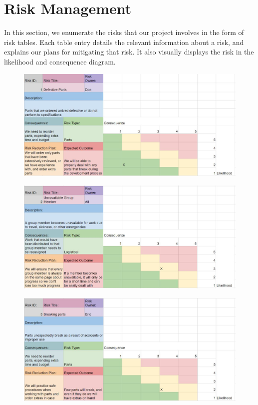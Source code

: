 
\section{Risk Management}
\label{sec:risk_management}

In this section, we enumerate the risks that our project involves in the form of risk tables. Each table entry details the relevant information about a risk, and explains our plans for mitigating that risk. It also visually displays the risk in the likelihood and consequence diagram. 

\begin{figure}[h!]
\centering
\includegraphics[width=0.98\columnwidth]{risks/risk1.JPG}
\label{fig:risk1}
\end{figure}
\begin{figure}[h!]
\centering
\includegraphics[width=0.98\columnwidth]{risks/risk2.JPG}
\label{fig:risk2}
\end{figure}
\begin{figure}[h!]
\centering
\includegraphics[width=0.98\columnwidth]{risks/risk3.JPG}
\label{fig:risk3}
\end{figure}
